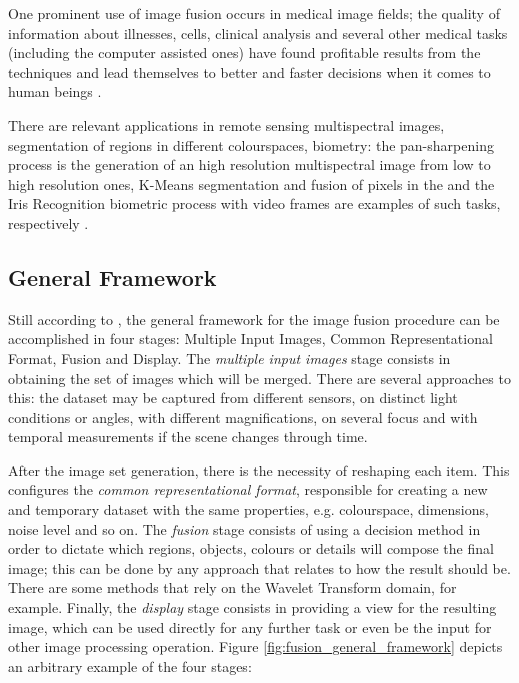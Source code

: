 

One prominent use of image fusion occurs in medical image fields; the quality of information about illnesses, cells, clinical analysis and several other medical tasks (including the computer assisted ones) have found profitable results from the techniques and lead themselves to better and faster decisions when it comes to human beings \cite{james2014medical}.

There are relevant applications in remote sensing multispectral images, segmentation of regions in different colourspaces, biometry: the pan-sharpening process is the generation of an high resolution multispectral image from low to high resolution ones, K-Means segmentation and fusion of pixels in the  and the Iris Recognition biometric process with video frames are examples of such tasks, respectively \cite{mitchell2010image}.

\subsection{General Framework}

Still according to , the general framework for the image fusion procedure can be accomplished in four stages: Multiple Input Images, Common Representational Format, Fusion and Display.
The \emph{multiple input images} stage consists in obtaining the set of images which will be merged. There are several approaches to this: the dataset may be captured from different sensors, on distinct light conditions or angles, with different magnifications, on several focus and with temporal measurements if the scene changes through time.

After the image set generation, there is the necessity of reshaping each item. This configures the \emph{common representational format}, responsible for creating a new and temporary dataset with the same properties, e.g. colourspace, dimensions, noise level and so on. The \emph{fusion} stage consists of using a decision method in order to dictate which regions, objects, colours or details will compose the final image; this can be done by any approach that relates to how the result should be. There are some methods that rely on the Wavelet Transform domain, for example. Finally, the \emph{display} stage consists in providing a view for the resulting image, which can be used directly for any further task or even be the input for other image processing operation. Figure \ref{fig:fusion_general_framework} depicts an arbitrary example of the four stages:

